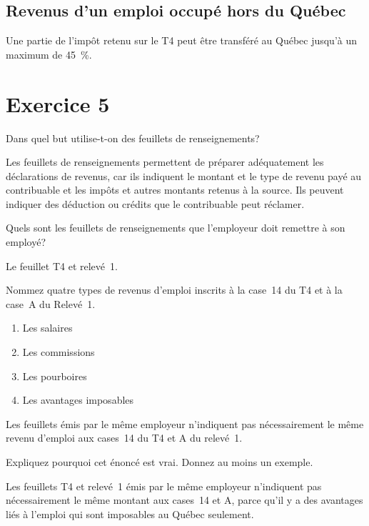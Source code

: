 \subsection{Revenus d'un emploi occupé hors du Québec}
Une partie de l'impôt retenu sur le T4 peut être transféré au Québec jusqu'à un maximum de 45~\%.



\section{Exercice 5}
\setcounter{question}{0}
\begin{question}
	Dans quel but utilise-t-on des feuillets de renseignements?
\end{question}
Les feuillets de renseignements permettent de préparer adéquatement les déclarations de revenus, car ils indiquent le montant et le type de revenu payé au contribuable et les impôts et autres montants retenus à la source.
Ils peuvent indiquer des déduction ou crédits que le contribuable peut réclamer.

\begin{question}
	Quels sont les feuillets de renseignements que l'employeur doit remettre à son employé?
\end{question}
Le feuillet T4 et relevé~1.

\begin{question}
	Nommez quatre types de revenus d'emploi inscrits à la case~14 du T4 et à la case~A du Relevé~1.
\end{question}
\begin{enumerate}
	\item Les salaires 
	\item Les commissions 
	\item Les pourboires  
	\item Les avantages imposables
\end{enumerate}

\begin{question}
	Les feuillets émis par le même employeur n'indiquent pas nécessairement le même revenu d'emploi aux cases~14 du T4 et A du relevé~1.
	
	Expliquez pourquoi cet énoncé est vrai. Donnez au moins un exemple.
\end{question}
Les feuillets T4 et relevé~1 émis par le même employeur n'indiquent pas nécessairement le même montant aux cases~14 et A, parce qu'il y a des avantages liés à l'emploi qui sont imposables au Québec seulement.


